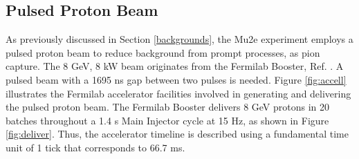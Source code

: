 \subsection{Pulsed Proton Beam}\label{pulsedprotonbeam}
As previously discussed in Section  \ref{backgrounds}, the Mu2e experiment employs a pulsed proton beam to reduce background from prompt processes, as pion capture. The 8 GeV, 8 kW beam originates from the Fermilab Booster, Ref. \cite{PhysRevAccelBeams.20.111003}. A pulsed beam with a 1695 ns gap between two pulses is needed. Figure \ref{fig:accell} illustrates the Fermilab accelerator facilities involved in generating and delivering the pulsed proton beam. The Fermilab Booster delivers 8 GeV protons in 20 batches throughout a 1.4 s Main Injector cycle at 15 Hz, as shown in Figure \ref{fig:deliver}. Thus, the accelerator timeline is described using a fundamental time unit of 1 tick that corresponds to 66.7 ms.

